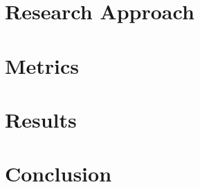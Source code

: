 \documentclass{acm_proc_article-sp}
\begin{document}
\section{Research Approach}

\section{Metrics}

\section{Results}

\section{Conclusion}



\end{document}
